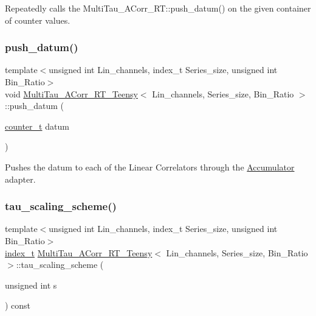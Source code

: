 Repeatedly calls the Multi\+Tau\+\_\+\+A\+Corr\+\_\+\+R\+T\+::push\+\_\+datum() on the given container of counter values. 

\mbox{\label{classMultiTau__ACorr__RT__Teensy_a1ad6126310c987f53a0ec7ab3ae03a12}} 
\subsubsection{\texorpdfstring{push\+\_\+datum()}{push\_datum()}}
{\footnotesize\ttfamily template$<$unsigned int Lin\+\_\+channels, index\+\_\+t Series\+\_\+size, unsigned int Bin\+\_\+\+Ratio$>$ \\
void \hyperlink{classMultiTau__ACorr__RT__Teensy}{Multi\+Tau\+\_\+\+A\+Corr\+\_\+\+R\+T\+\_\+\+Teensy}$<$ Lin\+\_\+channels, Series\+\_\+size, Bin\+\_\+\+Ratio $>$\+::push\+\_\+datum (\begin{DoxyParamCaption}\item[{\hyperlink{types_8hpp_a22f279793847eba127de149437848c48}{counter\+\_\+t}}]{datum }\end{DoxyParamCaption})\hspace{0.3cm}{\ttfamily [inline]}}



Pushes the datum to each of the Linear Correlators through the \hyperlink{classAccumulator}{Accumulator} adapter. 

\mbox{\label{classMultiTau__ACorr__RT__Teensy_af90bc219b8b9dc316c56efd7c74aae6f}} 
\subsubsection{\texorpdfstring{tau\+\_\+scaling\+\_\+scheme()}{tau\_scaling\_scheme()}}
{\footnotesize\ttfamily template$<$unsigned int Lin\+\_\+channels, index\+\_\+t Series\+\_\+size, unsigned int Bin\+\_\+\+Ratio$>$ \\
\hyperlink{types_8hpp_a7c40bb931c31595ed6308605f4537447}{index\+\_\+t} \hyperlink{classMultiTau__ACorr__RT__Teensy}{Multi\+Tau\+\_\+\+A\+Corr\+\_\+\+R\+T\+\_\+\+Teensy}$<$ Lin\+\_\+channels, Series\+\_\+size, Bin\+\_\+\+Ratio $>$\+::tau\+\_\+scaling\+\_\+scheme (\begin{DoxyParamCaption}\item[{unsigned int}]{s }\end{DoxyParamCaption}) const\hspace{0.3cm}{\ttfamily [inline]}}



